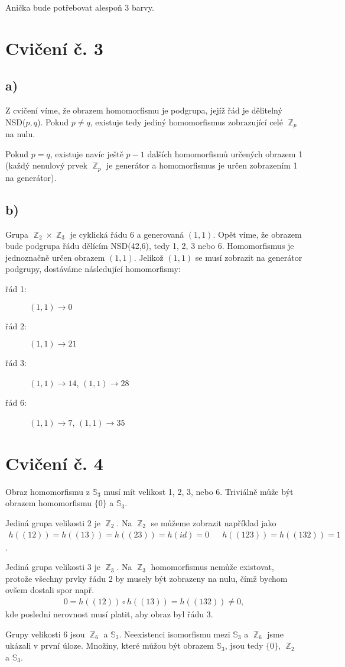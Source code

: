 \documentclass{scrartcl}
\DeclareMathOperator{\Z}{\mathbb{Z}}
\begin{document}
    Anička bude potřebovat alespoň 3 barvy.
    \section*{Cvičení č. 3}
    \subsection*{a)}
    Z cvičení víme, že obrazem homomorfismu je podgrupa, jejíž řád je dělitelný NSD($p,q$). Pokud $p \neq q$, existuje tedy jediný homomorfismus zobrazující celé $\Z_p$ na nulu.

    Pokud $p = q$, existuje navíc ještě $p-1$ dalších homomorfismů určených obrazem 1 (každý nenulový prvek $\Z_p$ je generátor a homomorfismus je určen zobrazením 1 na generátor).
    \subsection*{b)}
    Grupa $\Z_2 \times \Z_3$ je cyklická řádu 6 a generovaná $(1,1)$. Opět víme, že obrazem bude podgrupa řádu dělícím NSD(42,6), tedy 1, 2, 3 nebo 6. Homomorfismus je jednoznačně určen obrazem $(1,1)$. Jelikož $(1,1)$ se musí zobrazit na generátor podgrupy, dostáváme následující homomorfismy:
    \begin{description}
        \item[řád 1:] $(1,1) \rightarrow 0$
        \item[řád 2:] $(1,1) \rightarrow 21$
        \item[řád 3:] $(1,1) \rightarrow 14$, $(1,1) \rightarrow 28$
        \item[řád 6:] $(1,1) \rightarrow 7$, $(1,1) \rightarrow 35$   
    \end{description}

    \section*{Cvičení č. 4}
    Obraz homomorfismu z $\mathbb{S}_3$ musí mít velikost 1, 2, 3, nebo 6. Triviálně může být obrazem homomorfismu $\{0\}$ a $\mathbb{S}_3$. 

    Jediná grupa velikosti 2 je $\Z_2$. Na $\Z_2$ se můžeme zobrazit například jako 
    \begin{align*}
        h((12)) = h((13)) = h((23)) = h(id) = 0 && h((123)) = h((132)) = 1
    \end{align*}.

    Jediná grupa velikosti 3 je $\Z_3$. Na $\Z_3$ homomorfismus nemůže existovat, protože všechny prvky řádu 2 by musely být zobrazeny na nulu, čímž bychom ovšem dostali spor např.
    \begin{align*}
        0 = h((12))\circ h((13)) = h((132)) \neq 0,
    \end{align*}
    kde poslední nerovnost musí platit, aby obraz byl řádu 3.

    Grupy velikosti 6 jsou $\Z_6$ a $\mathbb{S}_3$. Neexistenci isomorfismu mezi $\mathbb{S}_3$ a $\Z_6$ jsme ukázali v první úloze. Množiny, které můžou být obrazem $\mathbb{S}_3$, jsou tedy $\{0\}$, $\Z_2$ a $\mathbb{S}_3$.
\end{document}
